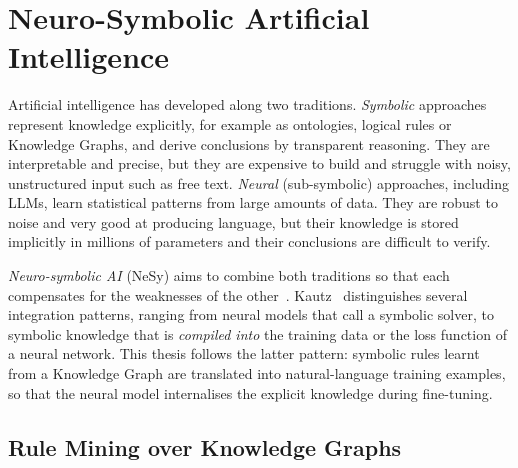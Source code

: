 
\section{Neuro-Symbolic Artificial Intelligence}
\label{sec:bg-nesy}

Artificial intelligence has developed along two traditions. \emph{Symbolic}
approaches represent knowledge explicitly, for example as ontologies, logical
rules or Knowledge Graphs, and derive conclusions by transparent reasoning.
They are interpretable and precise, but they are expensive to build and
struggle with noisy, unstructured input such as free text.
\emph{Neural} (sub-symbolic) approaches, including LLMs, learn statistical
patterns from large amounts of data. They are robust to noise and very good
at producing language, but their knowledge is stored implicitly in millions
of parameters and their conclusions are difficult to verify.

\emph{Neuro-symbolic AI} (NeSy) aims to combine both traditions so that
each compensates for the weaknesses of the other~\cite{garcez2023neurosymbolic,kautz2022third}.
Kautz~\cite{kautz2022third} distinguishes several integration patterns,
ranging from neural models that call a symbolic solver, to symbolic knowledge
that is \emph{compiled into} the training data or the loss function of a
neural network. This thesis follows the latter pattern: symbolic rules learnt
from a Knowledge Graph are translated into natural-language training
examples, so that the neural model internalises the explicit knowledge
during fine-tuning.

\subsection{Rule Mining over Knowledge Graphs}
\label{sec:bg-rule-mining}

